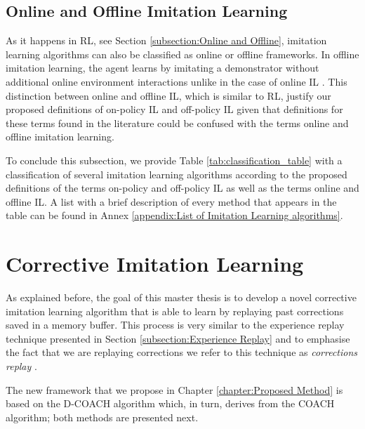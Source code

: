 \subsection{Online and Offline Imitation Learning}
\label{subsubsection:online and offlineImitation Learning}
As it happens in RL, see Section \ref{subsection:Online and Offline}, imitation learning algorithms can also be classified as online or offline frameworks. In offline imitation learning, the agent learns by imitating a demonstrator without additional online environment interactions unlike in the case of online IL \cite{offlineIL}. This distinction between online and offline IL, which is similar to RL, justify our proposed definitions of on-policy IL and off-policy IL given that definitions for these terms found in the literature could be confused with the terms online and offline imitation learning.


To conclude this subsection, we provide Table \ref{tab:classification_table} with a classification of several imitation learning algorithms according to the proposed definitions of the terms on-policy and off-policy IL as well as the terms online and offline IL. A list with a brief description of every method that appears in the table can be found in Annex \ref{appendix:List of Imitation Learning algorithms}.






\section{Corrective Imitation Learning}
\label{section:Corrective Imitation Learning}

As explained before, the goal of this master thesis is to develop a novel corrective imitation learning algorithm that is able to learn by replaying past corrections saved in a memory buffer. This process is very similar to the experience replay technique presented in Section \ref{subsection:Experience Replay} and to emphasise the fact that we are replaying corrections we refer to this technique as \textit{corrections replay} \cite{corrections-replay}.

The new framework that we propose in Chapter \ref{chapter:Proposed Method} is based on the D-COACH algorithm which, in turn, derives from the COACH algorithm; both methods are presented next.







